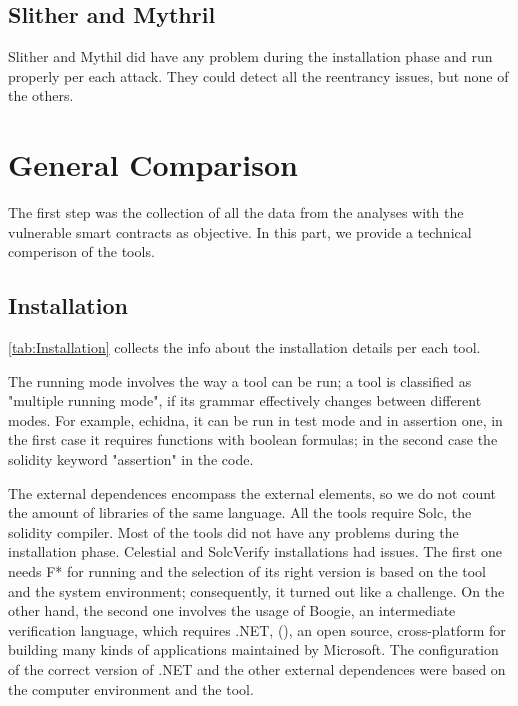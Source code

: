 \subsection*{Slither and Mythril} Slither and Mythil did have any problem during the installation phase and run properly per each attack. 
They could detect all the reentrancy issues, but none of the others.

\section{General Comparison}

The first step was the collection of all the data from the analyses with the vulnerable smart contracts as objective. 
In this part, we provide a technical comperison of the tools. 


\subsection{Installation} 
\autoref{tab:Installation} collects the info about the installation details per each tool. 

The running mode involves the way a tool can be run; a tool is classified as "multiple running mode", if its grammar effectively changes between different modes. For example, echidna, it can be run in
test mode and in assertion one, in the first case it requires functions with boolean formulas; in the second case the solidity keyword "assertion" in the code.

The external dependences encompass the external elements, so we do not count the amount of libraries of the same language.
All the tools require Solc, the solidity compiler.
Most of the tools did not have any problems during the installation phase. Celestial and SolcVerify installations had issues.  
The first one needs F* for running and the selection of its right version is
based on the tool and the system environment; consequently, it turned out like a challenge.
On the other hand, the second one involves the usage of Boogie, an intermediate verification language, which requires .NET, (\cite{NET}),
an open source, cross-platform for building many kinds of applications maintained by Microsoft.
The configuration of the correct version of .NET and the other external dependences were based on the computer environment and the tool.

